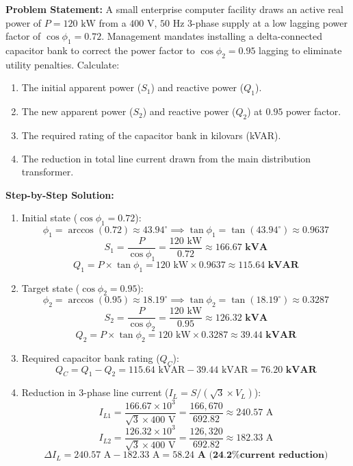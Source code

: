 \begin{tcolorbox}[colback=white,colframe=navyblue,title=\textbf{Problem 8: Data Center Power Factor Correction}]
\textbf{Problem Statement:} A small enterprise computer facility draws an active real power of $P = 120\text{ kW}$ from a $400\text{ V}$, $50\text{ Hz}$ 3-phase supply at a low lagging power factor of $\cos\phi_1 = 0.72$. Management mandates installing a delta-connected capacitor bank to correct the power factor to $\cos\phi_2 = 0.95$ lagging to eliminate utility penalties. Calculate:
\begin{enumerate}[label=(\alph*),leftmargin=*]
    \item The initial apparent power ($S_1$) and reactive power ($Q_1$).
    \item The new apparent power ($S_2$) and reactive power ($Q_2$) at $0.95$ power factor.
    \item The required rating of the capacitor bank in kilovars (kVAR).
    \item The reduction in total line current drawn from the main distribution transformer.
\end{enumerate}
\textbf{Step-by-Step Solution:}
\begin{enumerate}[label=(\alph*),leftmargin=*]
    \item Initial state ($\cos\phi_1 = 0.72$):
    \[
    \phi_1 = \arccos(0.72) \approx 43.94^\circ \implies \tan\phi_1 = \tan(43.94^\circ) \approx 0.9637
    \]
    \[
    S_1 = \frac{P}{\cos\phi_1} = \frac{120\text{ kW}}{0.72} \approx \mathbf{166.67\text{ kVA}}
    \]
    \[
    Q_1 = P \times \tan\phi_1 = 120\text{ kW} \times 0.9637 \approx \mathbf{115.64\text{ kVAR}}
    \]
    \item Target state ($\cos\phi_2 = 0.95$):
    \[
    \phi_2 = \arccos(0.95) \approx 18.19^\circ \implies \tan\phi_2 = \tan(18.19^\circ) \approx 0.3287
    \]
    \[
    S_2 = \frac{P}{\cos\phi_2} = \frac{120\text{ kW}}{0.95} \approx \mathbf{126.32\text{ kVA}}
    \]
    \[
    Q_2 = P \times \tan\phi_2 = 120\text{ kW} \times 0.3287 \approx \mathbf{39.44\text{ kVAR}}
    \]
    \item Required capacitor bank rating ($Q_C$):
    \[
    Q_C = Q_1 - Q_2 = 115.64\text{ kVAR} - 39.44\text{ kVAR} = \mathbf{76.20\text{ kVAR}}
    \]
    \item Reduction in 3-phase line current ($I_L = S / (\sqrt{3} \times V_L)$):
    \[
    I_{L1} = \frac{166.67 \times 10^3}{\sqrt{3} \times 400\text{ V}} = \frac{166,670}{692.82} \approx 240.57\text{ A}
    \]
    \[
    I_{L2} = \frac{126.32 \times 10^3}{\sqrt{3} \times 400\text{ V}} = \frac{126,320}{692.82} \approx 182.33\text{ A}
    \]
    \[
    \Delta I_L = 240.57\text{ A} - 182.33\text{ A} = \mathbf{58.24\text{ A (24.2\% current reduction)}}
    \]
\end{enumerate}
\end{tcolorbox}

